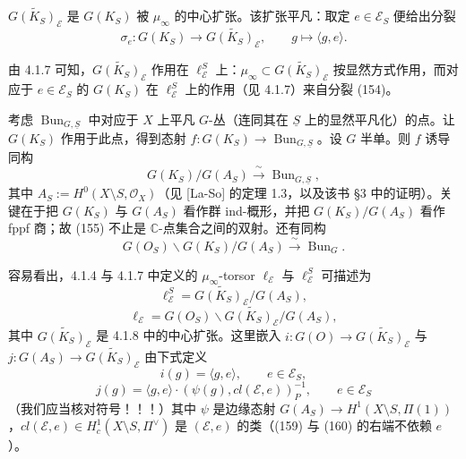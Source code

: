 $\widetilde{G(K_S)_{\mathcal{E}}}$ 是 $G(K_S)$ 被 $\mu_\infty$ 的中心扩张。该扩张平凡：取定 $e\in\mathcal{E}_S$ 便给出分裂
\begin{equation}\tag{154}
\sigma_e:G(K_S)\to\widetilde{G(K_S)_{\mathcal{E}}},\qquad g\mapsto\langle g,e\rangle.
\end{equation}

由 4.1.7 可知，$\widetilde{G(K_S)_{\mathcal{E}}}$ 作用在 $\ell^S_{\mathcal{E}}$ 上：$\mu_\infty\subset\widetilde{G(K_S)_{\mathcal{E}}}$ 按显然方式作用，而对应于 $e\in\mathcal{E}_S$ 的 $G(K_S)$ 在 $\ell^S_{\mathcal{E}}$ 上的作用（见 4.1.7）来自分裂 (154)。

 考虑 $\operatorname{Bun}_{G,\underline{S}}$ 中对应于 $X$ 上平凡 $G$-丛（连同其在 $\underline{S}$ 上的显然平凡化）的点。让 $G(K_S)$ 作用于此点，得到态射 $f:G(K_S)\to\operatorname{Bun}_{G,\underline{S}}$。设 $G$ 半单。则 $f$ 诱导同构
\begin{equation}\tag{155}
G(K_S)/G(A_S)\xrightarrow{\ \sim\ }\operatorname{Bun}_{G,\underline{S}},
\end{equation}
其中 $A_S:=H^0(X\setminus S,\mathcal{O}_X)$（见 [La-So] 的定理 1.3，以及该书 §3 中的证明）。关键在于把 $G(K_S)$ 与 $G(A_S)$ 看作群 ind-概形，并把 $G(K_S)/G(A_S)$ 看作 fppf 商；故 (155) 不止是 $\mathbb{C}$-点集合之间的双射。还有同构
\begin{equation}\tag{156}
G(O_S)\backslash G(K_S)/G(A_S)\xrightarrow{\ \sim\ }\operatorname{Bun}_G.
\end{equation}


容易看出，4.1.4 与 4.1.7 中定义的 $\mu_\infty$-torsor $\ell_{\mathcal{E}}$ 与 $\ell^S_{\mathcal{E}}$ 可描述为
\begin{equation}\tag{157}
\ell^S_{\mathcal{E}}=\widetilde{G(K_S)_{\mathcal{E}}}/G(A_S),
\end{equation}
\begin{equation}\tag{158}
\ell_{\mathcal{E}}=G(O_S)\backslash\widetilde{G(K_S)_{\mathcal{E}}}/G(A_S),
\end{equation}
 其中 $\widetilde{G(K_S)_{\mathcal{E}}}$ 是 4.1.8 中的中心扩张。这里嵌入 $i:G(O)\to\widetilde{G(K_S)_{\mathcal{E}}}$ 与 $j:G(A_S)\to\widetilde{G(K_S)_{\mathcal{E}}}$ 由下式定义
\begin{equation}\tag{159}
i(g)=\langle g,e\rangle,\qquad e\in\mathcal{E}_S,
\end{equation}
\begin{equation}\tag{160}
j(g)=\langle g,e\rangle\cdot(\psi(g),cl(\mathcal{E},e))_P^{-1},\qquad e\in\mathcal{E}_S
\end{equation}
（我们应当核对符号！！！）其中 $\psi$ 是边缘态射 $G(A_S)\to H^1(X\setminus S,\Pi(1))$，$cl(\mathcal{E},e)\in H^1_c(X\setminus S,\Pi^{\vee})$ 是 $(\mathcal{E},e)$ 的类（(159) 与 (160) 的右端不依赖 $e$）。


